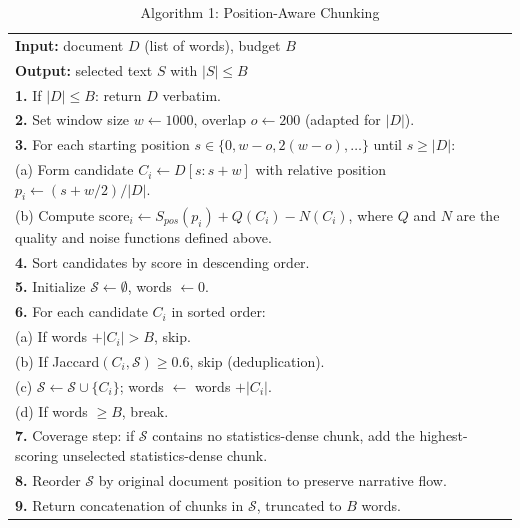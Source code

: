 \documentclass{ieeeaccess}
\begin{document}
\begin{table}[h]
\caption{Algorithm 1: Position-Aware Chunking}
\label{alg:pac}
\centering
\footnotesize
\begin{tabular}{|p{}|}
\hline
\textbf{Input:} document $D$ (list of words), budget $B$ \\
\textbf{Output:} selected text $S$ with $|S| \leq B$ \\
\hline
\textbf{1.} If $|D| \leq B$: return $D$ verbatim. \\
\textbf{2.} Set window size $w \leftarrow 1000$, overlap $o \leftarrow 200$ (adapted for $|D|$). \\
\textbf{3.} For each starting position $s \in \{0, w-o, 2(w-o), \ldots\}$ until $s \geq |D|$: \\
\hspace*{1em} (a) Form candidate $C_i \leftarrow D[s : s+w]$ with relative position $p_i \leftarrow (s + w/2)/|D|$. \\
\hspace*{1em} (b) Compute $\text{score}_i \leftarrow S_{pos}(p_i) + Q(C_i) - N(C_i)$, where $Q$ and $N$ are the quality and noise functions defined above. \\
\textbf{4.} Sort candidates by score in descending order. \\
\textbf{5.} Initialize $\mathcal{S} \leftarrow \emptyset$, words $\leftarrow 0$. \\
\textbf{6.} For each candidate $C_i$ in sorted order: \\
\hspace*{1em} (a) If words $+ |C_i| > B$, skip. \\
\hspace*{1em} (b) If Jaccard$(C_i, \mathcal{S}) \geq 0.6$, skip (deduplication). \\
\hspace*{1em} (c) $\mathcal{S} \leftarrow \mathcal{S} \cup \{C_i\}$; words $\leftarrow$ words $+ |C_i|$. \\
\hspace*{1em} (d) If words $\geq B$, break. \\
\textbf{7.} Coverage step: if $\mathcal{S}$ contains no statistics-dense chunk, add the highest-scoring unselected statistics-dense chunk. \\
\textbf{8.} Reorder $\mathcal{S}$ by original document position to preserve narrative flow. \\
\textbf{9.} Return concatenation of chunks in $\mathcal{S}$, truncated to $B$ words. \\
\hline
\end{tabular}
\end{table}
\end{document}
